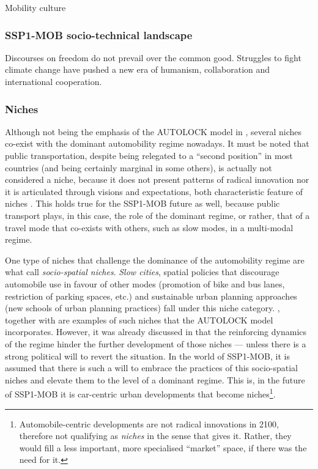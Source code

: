 Mobility culture 

\subsubsection*{SSP1-MOB socio-technical landscape}
Discourses on freedom do not prevail over the common good. Struggles to fight climate change have pushed a new era of humanism, collaboration and international cooperation. 


\subsubsection*{Niches}
Although not being the emphasis of the AUTOLOCK model in , several niches co-exist with the dominant automobility regime nowadays. It must be noted that public transportation, despite being relegated to a ``second position'' in most countries (and being certainly marginal in some others), is actually not considered a niche, because it does not present patterns of radical innovation nor it is articulated through visions and expectations, both characteristic feature of niches \parencite{geels2012_MultiLevelPerspective}. This holds true for the SSP1-MOB future as well, because public transport plays, in this case, the role of the dominant regime, or rather, that of a travel mode that co-exists with others, such as slow modes, in a multi-modal regime.

One type of niches that challenge the dominance of the automobility regime are what \textcite{zijlstra2012_SocioSpatialPerspective} call \emph{socio-spatial niches}. \emph{Slow cities}, spatial policies that discourage automobile use in favour of other modes (promotion of bike and bus lanes, restriction of parking spaces, etc.) and sustainable urban planning approaches (new schools of urban planning practices) fall under this niche category. , together with  are examples of such niches that the AUTOLOCK model incorporates. However, it was already discussed in  that the reinforcing dynamics of the regime hinder the further development of those niches --- unless there is a strong political will to revert the situation. In the world of SSP1-MOB, it is assumed that there is such a will to embrace the practices of this socio-spatial niches and elevate them to the level of a dominant regime. This is, in the future of SSP1-MOB it is car-centric urban developments that become niches\footnote{Automobile-centric developments are not radical innovations in 2100, therefore not qualifying as \emph{niches} in the sense that \textcite{geels2012_MultiLevelPerspective} gives it. Rather, they would fill a less important, more specialised ``market'' space, if there was the need for it.}.

